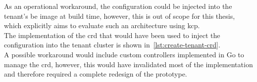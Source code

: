 \documentclass[11pt, a4paper, oneside, listof=totoc]{scrartcl}
\begin{document}
                As an operational workaround, the configuration could be injected into the tenant's
                \gls{be} image at build time, however, this is out of scope for this thesis, which
                explicitly aims to evaluate such an architecture using \gls{kcp}.\\
                The implementation of the \gls{crd} that would have been used to inject the
                configuration into the tenant cluster is shown in~\autoref{lst:create-tenant-crd}.\\
                A possible workaround would include custom controllers implemented in Go to manage
                the \gls{crd}, however, this would have invalidated most of the implementation and
                therefore required a complete redesign of the prototype.
\end{document}
